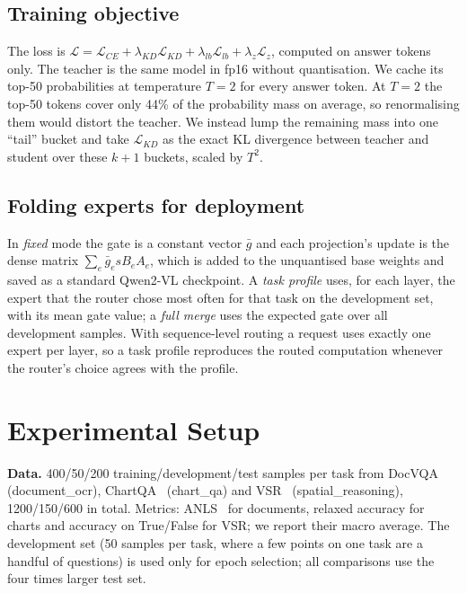 \documentclass[conference]{IEEEtran}
\begin{document}
\subsection{Training objective}
The loss is $\mathcal{L}=\mathcal{L}_{CE}+\lambda_{KD}\mathcal{L}_{KD}+\lambda_{lb}\mathcal{L}_{lb}+\lambda_z\mathcal{L}_z$,
computed on answer tokens only. The teacher is the same model in fp16 without quantisation. We cache its
top-50 probabilities at temperature $T=2$ for every answer token. At $T=2$ the top-50 tokens cover only 44\% of
the probability mass on average, so renormalising them would distort the teacher. We instead lump the
remaining mass into one ``tail'' bucket and take $\mathcal{L}_{KD}$ as the exact KL divergence between
teacher and student over these $k{+}1$ buckets, scaled by $T^2$.

\subsection{Folding experts for deployment}
In \emph{fixed} mode the gate is a constant vector $\bar g$ and each projection's update is the dense
matrix $\sum_e \bar g_e s B_e A_e$, which is added to the unquantised base weights and saved as a standard
Qwen2-VL checkpoint. A \emph{task profile} uses, for each layer, the expert that the router chose most often
for that task on the development set, with its mean gate value; a \emph{full merge} uses the expected gate
over all development samples. With sequence-level routing a request uses exactly one expert per layer, so a
task profile reproduces the routed computation whenever the router's choice agrees with the profile.

\section{Experimental Setup}
\textbf{Data.} 400/50/200 training/development/test samples per task from DocVQA~\cite{mathew2021docvqa}
(document\_ocr), ChartQA~\cite{masry2022chartqa} (chart\_qa) and VSR~\cite{liu2023vsr} (spatial\_reasoning),
1200/150/600 in total. Metrics: ANLS~\cite{biten2019stvqa} for documents, relaxed accuracy for charts and
accuracy on True/False for VSR; we report their macro average. The development set (50 samples per task, where a few
points on one task are a handful of questions) is used only for epoch selection; all comparisons use the
four times larger test set.
\end{document}
